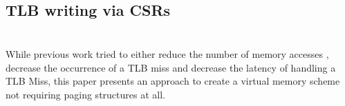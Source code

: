 \subsection{TLB writing via CSRs}




\section{}











While previous work tried to either reduce the number of memory accesses ,
decrease the occurrence of a TLB miss and decrease the latency of handling a TLB Miss, this paper
presents an approach to create a virtual memory scheme not requiring paging structures at all.\\

